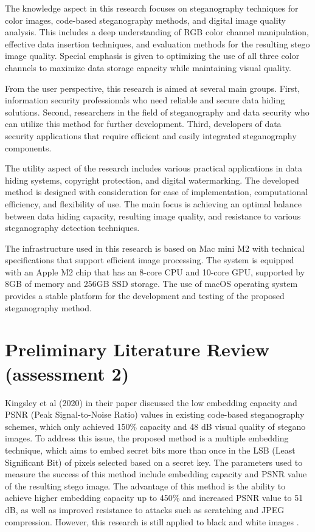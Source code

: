 \documentclass{ittelkom}
\begin{document}
The knowledge aspect in this research focuses on steganography techniques for
color images, code-based steganography methods, and digital image quality
analysis. This includes a deep understanding of RGB color channel manipulation,
effective data insertion techniques, and evaluation methods for the resulting
stego image quality. Special emphasis is given to optimizing the use of all
three color channels to maximize data storage capacity while maintaining visual
quality.

From the user perspective, this research is aimed at several main groups.
First, information security professionals who need reliable and secure data
hiding solutions. Second, researchers in the field of steganography and data
security who can utilize this method for further development. Third, developers
of data security applications that require efficient and easily integrated
steganography components.

The utility aspect of the research includes various practical applications in
data hiding systems, copyright protection, and digital watermarking. The
developed method is designed with consideration for ease of implementation,
computational efficiency, and flexibility of use. The main focus is achieving
an optimal balance between data hiding capacity, resulting image quality, and
resistance to various steganography detection techniques.

The infrastructure used in this research is based on Mac mini M2 with technical
specifications that support efficient image processing. The system is equipped
with an Apple M2 chip that has an 8-core CPU and 10-core GPU, supported by 8GB
of memory and 256GB SSD storage. The use of macOS operating system provides a
stable platform for the development and testing of the proposed steganography
method.

\section{Preliminary Literature Review \color{red}(assessment 2)}

Kingsley et al (2020) in their paper discussed the low embedding capacity and
PSNR (Peak Signal-to-Noise Ratio) values in existing code-based steganography
schemes, which only achieved 150\% capacity and 48 dB visual quality of stegano
images. To address this issue, the proposed method is a multiple embedding
technique, which aims to embed secret bits more than once in the LSB (Least
Significant Bit) of pixels selected based on a secret key. The parameters used
to measure the success of this method include embedding capacity and PSNR value
of the resulting stego image. The advantage of this method is the ability to
achieve higher embedding capacity up to 450\% and increased PSNR value to 51
dB, as well as improved resistance to attacks such as scratching and JPEG
compression. However, this research is still applied to black and white images
\cite{kingsley2020improving}.
\end{document}
